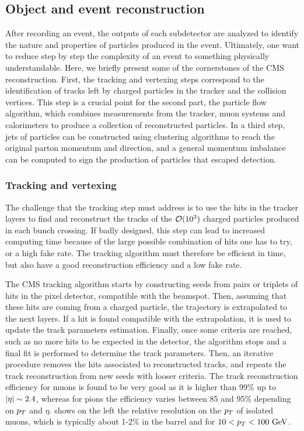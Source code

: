     \subsection{Object and event reconstruction}

    After recording an event, the outputs of each subdetector
    are analyzed to identify the nature and properties of particles produced in the
    event. Ultimately, one want to reduce step by step the complexity of an event to
    something physically understandable. Here, we briefly present some of the
    cornerstones of the CMS reconstruction. First, the tracking and vertexing steps
    correspond to the identification of tracks left by charged particles in the tracker
    and the collision vertices. This step is a crucial point for the second part, the
    particle flow algorithm, which combines measurements from the tracker, muon systems
    and calorimeters to produce a collection of reconstructed particles. In a third step,
    jets of particles can be constructed using clustering algorithms to reach the original
    parton momentum and direction, and a general momentum imbalance can be computed
    to sign the production of particles that escaped detection.

        \subsubsection{Tracking and vertexing \label{sec:trackingAndVertexing}}

    The challenge that the tracking step must address is to use the hits in the
    tracker layers to find and reconstruct the tracks of the $\mathcal{O}(10^3)$ charged
    particles produced in each bunch crossing. If badly designed, this step can lead
    to increased computing time because of the large possible combination of hits one
    has to try, or a high fake rate. The tracking algorithm must therefore be efficient
    in time, but also have a good reconstruction efficiency and a low fake rate.

    The CMS tracking algorithm \cite{CMStracking} starts by constructing seeds from pairs or triplets of hits
    in the pixel detector, compatible with the beamspot. Then, assuming that these
    hits are coming from a charged particle, the trajectory is extrapolated to the
    next layers. If a hit is found compatible with the extrapolation, it is used to
    update the track parameters estimation. Finally, once some criteria are reached,
    such as no more hits to be expected in the detector, the algorithm stops and a
    final fit is performed to determine the track parameters. Then, an iterative procedure removes the
    hits associated to reconstructed tracks, and repeats the track reconstruction
    from new seeds with looser criteria.
    The track reconstruction efficiency for muons is found to be very good as it is
    higher than 99\% up to $\left| \eta \right| \sim 2.4$, whereas for pions the efficiency varies
    between 85 and 95\% depending on $p_T$ and $\eta$. 
    shows on the left the relative resolution on the $p_T$ of isolated muons, which
    is typically about 1-2\% in the barrel and for $10 < p_T < 100~\text{GeV}$.

